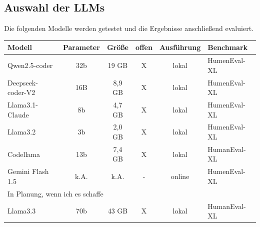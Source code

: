 

\subsection{Auswahl der LLMs}
Die folgenden Modelle werden getestet und die Ergebnisse anschließend evaluiert.
\begin{table}
	\begin{tabular}{|l|c|c|c|c|l|}
		\hline
		\textbf{Modell} & \textbf{Parameter} & \textbf{Größe} & \textbf{offen} & \textbf{Ausführung}  & \textbf{Benchmark} \\
		\hline
		Qwen2.5-coder     & 32b &  19 GB & X & lokal  & HumenEval-XL \\
		Deepseek-coder-V2 & 16B & 8,9 GB & X & lokal  & HumenEval-XL \\
		Llama3.1-Claude   &  8b & 4,7 GB & X & lokal  & HumenEval-XL \\
		Llama3.2          &  3b & 2,0 GB & X & lokal  & HumenEval-XL \\
		Codellama         & 13b & 7,4 GB & X & lokal  & HumanEval-XL \\
		Gemini Flash 1.5  & k.A.& k.A.   & - & online & HumenEval-XL \\
		\hline
		\multicolumn{6}{|l|}{In Planung, wenn ich es schaffe} \\
		\hline
		Llama3.3          & 70b &  43 GB & X & lokal  & HumanEval-XL \\
		\hline
	\end{tabular}
\end{table}


	
